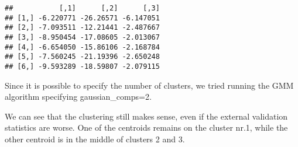 \documentclass[
]{article}
\newenvironment{Shaded}{\begin{snugshade}}{\end{snugshade}}
\newcommand{\AttributeTok}[1]{\textcolor[rgb]{0.77,0.63,0.00}{#1}}
\newcommand{\CommentTok}[1]{\textcolor[rgb]{0.56,0.35,0.01}{\textit{#1}}}
\newcommand{\DecValTok}[1]{\textcolor[rgb]{0.00,0.00,0.81}{#1}}
\newcommand{\FunctionTok}[1]{\textcolor[rgb]{0.00,0.00,0.00}{#1}}
\newcommand{\NormalTok}[1]{#1}
\newcommand{\OtherTok}[1]{\textcolor[rgb]{0.56,0.35,0.01}{#1}}
\newcommand{\SpecialCharTok}[1]{\textcolor[rgb]{0.00,0.00,0.00}{#1}}
\newcommand{\StringTok}[1]{\textcolor[rgb]{0.31,0.60,0.02}{#1}}
\begin{document}
\begin{verbatim}
##           [,1]      [,2]      [,3]
## [1,] -6.220771 -26.26571 -6.147051
## [2,] -7.093511 -12.21441 -2.487667
## [3,] -8.950454 -17.08605 -2.013067
## [4,] -6.654050 -15.86106 -2.168784
## [5,] -7.560245 -21.19396 -2.650248
## [6,] -9.593289 -18.59807 -2.079115
\end{verbatim}

Since it is possible to specify the number of clusters, we tried running
the GMM algorithm specifying gaussian\_comps=2.

We can see that the clustering still makes sense, even if the external
validation statistics are worse. One of the centroids remains on the
cluster nr.1, while the other centroid is in the middle of clusters 2
and 3.

\begin{Shaded}
\end{Shaded}
\end{document}
